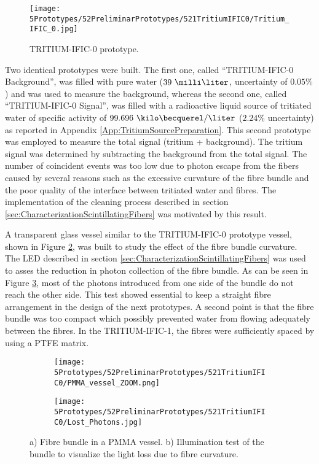 \begin{figure}[h]
\centering
\texttt{[image: 5Prototypes/52PreliminarPrototypes/521TritiumIFIC0/Tritium\_IFIC\_0.jpg]}
\caption{TRITIUM-IFIC-0 prototype.\label{fig:TritiumIFIC0}}
\end{figure}

Two identical prototypes were built. The first one, called ``TRITIUM-IFIC-0 Background'', was filled with pure water ($39~\milli\liter$, uncertainty of $0.05\%$) and was used to measure the background, whereas the second one, called ``TRITIUM-IFIC-0 Signal'', was filled with a radioactive liquid source of tritiated water of specific activity of $99.696~\kilo\becquerel/\liter$ ($2.24\%$ uncertainty) as reported in Appendix \ref{App:TritiumSourcePreparation}. This second prototype was employed to measure the total signal (tritium + background). The tritium signal was determined by subtracting the background from the total signal. The number of coincident events was too low due to photon escape from the fibers caused by several reasons such as the excessive curvature of the fibre bundle and the poor quality of the interface between tritiated water and fibres. The implementation of the cleaning process described in section \ref{sec:CharacterizationScintillatingFibers} was motivated by this result. 

A transparent glass vessel similar to the TRITIUM-IFIC-0 prototype vessel, shown in Figure \ref{subfig:PMMAVesselToTestLostPhotons}, was built to study the effect of the fibre bundle curvature. The LED described in section \ref{sec:CharacterizationScintillatingFibers} was used to asses the reduction in photon collection of the fibre bundle. As can be seen in Figure \ref{subfig:TestLostPhotons}, most of the photons introduced from one side of the bundle do not reach the other side. This test showed essential to keep a straight fibre arrangement in the design of the next prototypes. A second point is that the fibre bundle was too compact which possibly prevented water from flowing adequately between the fibres. In the TRITIUM-IFIC-1, the fibres were sufficiently spaced by using a PTFE matrix.

\begin{figure}
\centering
    \begin{subfigure}[b]{0.45\textwidth}
    \centering
    \texttt{[image: 5Prototypes/52PreliminarPrototypes/521TritiumIFIC0/PMMA\_vessel\_ZOOM.png]}  
    \caption{\label{subfig:PMMAVesselToTestLostPhotons}}
    \end{subfigure}
    \hfill
    \begin{subfigure}[b]{0.45\textwidth}
    \centering
    \texttt{[image: 5Prototypes/52PreliminarPrototypes/521TritiumIFIC0/Lost\_Photons.jpg]}  
    \caption{\label{subfig:TestLostPhotons}}
    \end{subfigure}
 \caption{a) Fibre bundle in a PMMA vessel. b) Illumination test of the bundle to visualize the light loss due to fibre curvature.}
 \label{fig:TestLostPhotons}
\end{figure}

